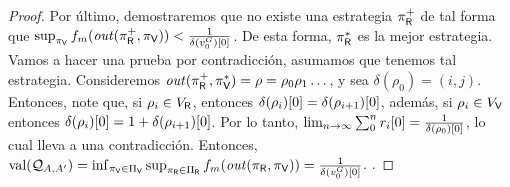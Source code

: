 \begin{proof}
Por último, demostraremos que no existe una estrategia $\pi^+_\Refuter$  de tal forma que $\sup_{\pi_\Verifier} \FMask(\out(\pi^+_\Refuter, \pi_\Verifier)) < \frac{1}{\pr{0}{\delta(v^G_0)}}$. 
De esta forma, $\pi^*_\Refuter$ es la mejor estrategia. 
Vamos a hacer una prueba por contradicción, asumamos que tenemos tal estrategia. Consideremos $\out(\pi^+_\Refuter, \pi^*_\Verifier) = \rho = \rho_0 \rho_1 \dots$, 
y sea $\delta(\rho_0) = (i,j)$. Entonces, note que, si $\rho_i \in V_\Refuter$, entonces $\pr{0}{\delta(\rho_i)} = \pr{0}{\delta(\rho_{i+1})}$, 
además, si $\rho_i \in V_\Verifier$ entonces $\pr{0}{\delta(\rho_i)} = 1 + \pr{0}{\delta(\rho_{i+1})}$. 
Por lo tanto, $\lim_{n \rightarrow \infty}\sum^n_{0} \pr{0}{r_i} = \frac{1}{\pr{0}{\delta(\rho_0)}}$, lo cual lleva a una contradicción.
Entonces, $\val(\QMStrGame) = \inf_{\pi_\Verifier \in \Pi_\Verifier} \sup_{\pi_\Refuter \in \Pi_\Refuter} \FMask(\out(\pi_\Refuter, \pi_\Verifier)) = \frac{1}{\pr{0}{\delta(v^G_0)}}$.
\qedhere
.

\end{proof} \\

